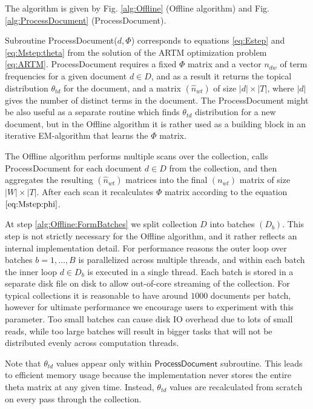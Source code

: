 \documentclass[russian,english]{llncs}
\newcommand{\kw}[1]{\textsf{#1}}
\begin{document}
The algorithm is given by
Fig. \ref{alg:Offline} (\kw{Offline algorithm}) and
Fig. \ref{alg:ProcessDocument} (\kw{ProcessDocument}).

Subroutine \kw{ProcessDocument($d, \Phi$)} corresponds to equations \eqref{eq:Estep} and \eqref{eq:Mstep:theta} from the solution of the ARTM optimization problem \eqref{eq:ARTM}.
\kw{ProcessDocument} requires a fixed $\Phi$ matrix
and a vector $n_{dw}$ of term frequencies for a given document $d \in D$,
and as a result it returns the topical distribution $\theta_{td}$ for the document,
and a matrix $(\hat n_{wt})$ of size $|d| \times |T|$,
where $|d|$ gives the number of distinct terms in the document.
The \kw{ProcessDocument} might be also useful as a separate routine which finds $\theta_{td}$ distribution for a new document,
but in the \kw{Offline algorithm} it is rather used as a building block in an iterative EM-algorithm that learns the $\Phi$ matrix.

The \kw{Offline algorithm} performs multiple scans over the collection, calls \kw{ProcessDocument}
for each document $d \in D$ from the collection,
and then aggregates the resulting $(\hat n_{wt})$ matrices into the final $(n_{wt})$ matrix of size $|W| \times |T|$.
After each scan it recalculates $\Phi$ matrix according to the equation $\eqref{eq:Mstep:phi}$.


At step \ref{alg:Offline:FormBatches} we split collection $D$ into batches $(D_b)$.
This step is not strictly necessary for the \kw{Offline algorithm},
and it rather reflects an internal implementation detail.
For performance reasons the outer loop over batches $b = 1, \dots, B$ is parallelized across multiple threads,
and within each batch the inner loop $d \in D_b$ is executed in a single thread.
Each batch is stored in a separate disk file on disk to allow out-of-core streaming of the collection.
For typical collections it is reasonable to have around $1000$ documents per batch,
however for ultimate performance we encourage users to experiment with this parameter.
Too small batches can cause disk IO overhead due to lots of small reads,
while too large batches will result in bigger tasks that will not be distributed evenly across computation threads.

Note that $\theta_{td}$ values appear only within $\kw{ProcessDocument}$ subroutine.
This leads to efficient memory usage because the implementation never stores the entire theta matrix at any given time.
Instead, $\theta_{td}$ values are recalculated from scratch on every pass through the collection.
\end{document}
